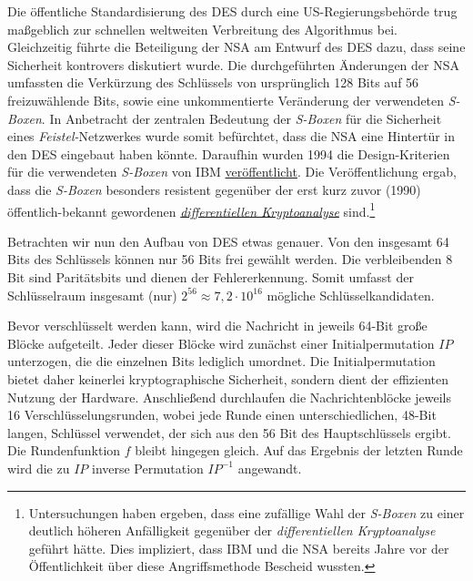 Die öffentliche Standardisierung des DES durch eine US-Regierungsbehörde trug maßgeblich zur schnellen weltweiten Verbreitung des Algorithmus bei. Gleichzeitig führte die Beteiligung der NSA am Entwurf des DES dazu, dass seine Sicherheit kontrovers diskutiert wurde. Die durchgeführten Änderungen der NSA umfassten die Verkürzung des Schlüssels von ursprünglich 128 Bits auf 56 freizuwählende Bits, sowie eine unkommentierte Veränderung der verwendeten \textit{S-Boxen}. In Anbetracht der zentralen Bedeutung der \textit{S-Boxen} für die Sicherheit eines \textit{Feistel-}Netzwerkes wurde somit befürchtet, dass die NSA eine Hintertür in den DES eingebaut haben könnte. Daraufhin wurden 1994 die Design-Kriterien für die verwendeten \textit{S-Boxen} von IBM \href{http://simson.net/ref/1994/coppersmith94.pdf}{veröffentlicht}. Die Veröffentlichung ergab, dass die \textit{S-Boxen} besonders resistent gegenüber der erst kurz zuvor (1990) öffentlich-bekannt gewordenen \hyperref[sssec:diffKryptoanalyse]{\textit{differentiellen Kryptoanalyse}} sind.\footnote{Untersuchungen haben ergeben, dass eine zufällige Wahl der \textit{S-Boxen} zu einer deutlich höheren Anfälligkeit gegenüber der \textit{differentiellen Kryptoanalyse} geführt hätte. Dies impliziert, dass IBM und die NSA bereits Jahre vor der Öffentlichkeit über diese Angriffsmethode Bescheid wussten.}

Betrachten wir nun den Aufbau von DES etwas genauer. Von den insgesamt 64 Bits des Schlüssels können nur 56 Bits frei gewählt werden. Die verbleibenden 8 Bit sind Paritätsbits und dienen der Fehlererkennung. Somit umfasst der Schlüsselraum insgesamt (nur) $2^{56}\approx 7,2\cdot 10^{16}$ mögliche Schlüsselkandidaten.

Bevor verschlüsselt werden kann, wird die Nachricht in jeweils 64-Bit große Blöcke aufgeteilt. Jeder dieser Blöcke wird zunächst einer Initialpermutation $IP$ unterzogen, die die einzelnen Bits lediglich umordnet. Die Initialpermutation bietet daher keinerlei kryptographische Sicherheit, sondern dient der effizienten Nutzung der Hardware. Anschließend durchlaufen die Nachrichtenblöcke jeweils 16 Verschlüsselungsrunden, wobei jede Runde  einen unterschiedlichen, 48-Bit langen, Schlüssel verwendet, der sich aus den 56 Bit des Hauptschlüssels ergibt. Die Rundenfunktion $f$ bleibt hingegen gleich. Auf das Ergebnis der letzten Runde wird die zu $IP$ inverse Permutation $IP^{-1}$ angewandt.

